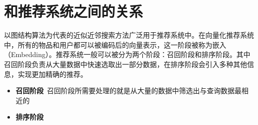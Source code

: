 





\section{和推荐系统之间的关系}\label{sec:bg-rm}

以图结构算法为代表的近似近邻搜索方法广泛用于推荐系统中。在向量化推荐系统中，所有的物品和用户都可以被编码后的向量表示，这一阶段被称为嵌入（Embedding）。推荐系统一般可以被分为两个阶段：召回阶段和排序阶段。其中召回阶段负责从大量数据中快速选取出一部分数据，在排序阶段会引入多种其他信息，实现更加精确的推荐。
\begin{itemize}
  \item \textbf{召回阶段}~召回阶段所需要处理的就是从大量的数据中筛选出与查询数据最相近的
  \item \textbf{排序阶段}
\end{itemize}






